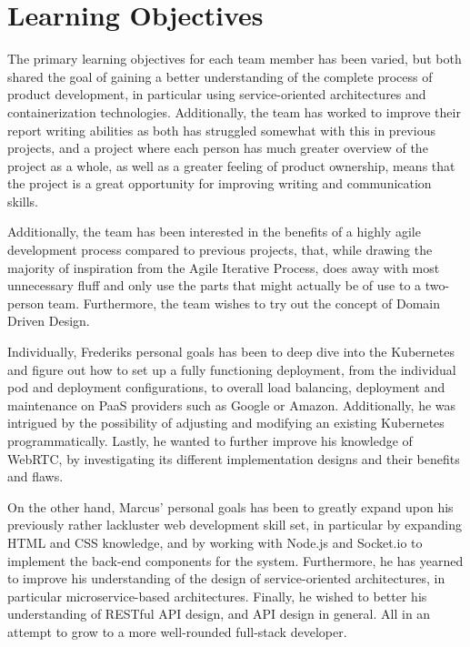 \chapter{Learning Objectives}

The primary learning objectives for each team member has been varied, but both shared the goal of gaining a better understanding of the complete process of product development, in particular using service-oriented architectures and containerization technologies. Additionally, the team has worked to improve their report writing abilities as both has struggled somewhat with this in previous projects, and a project where each person has much greater overview of the project as a whole, as well as a greater feeling of product ownership, means that the project is a great opportunity for improving writing and communication skills.

Additionally, the team has been interested in the benefits of a highly agile development process compared to previous projects, that, while drawing the majority of inspiration from the Agile Iterative Process, does away with most unnecessary fluff and only use the parts that might actually be of use to a two-person team. Furthermore, the team wishes to try out the concept of Domain Driven Design.

Individually, Frederiks personal goals has been to deep dive into the Kubernetes and figure out how to set up a fully functioning deployment, from the individual pod and deployment configurations, to overall load balancing, deployment and maintenance on PaaS providers such as Google or Amazon. Additionally, he was intrigued by the possibility of adjusting and modifying an existing Kubernetes programmatically. Lastly, he wanted to further improve his knowledge of WebRTC, by investigating its different implementation designs and their benefits and flaws. 

On the other hand, Marcus' personal goals has been to greatly expand upon his previously rather lackluster web development skill set, in particular by expanding HTML and CSS knowledge, and by working with Node.js and Socket.io to implement the back-end components for the system. Furthermore, he has yearned to improve his understanding of the design of service-oriented architectures, in particular microservice-based architectures. Finally, he wished to better his understanding of RESTful API design, and API design in general. All in an attempt to grow to a more well-rounded full-stack developer.